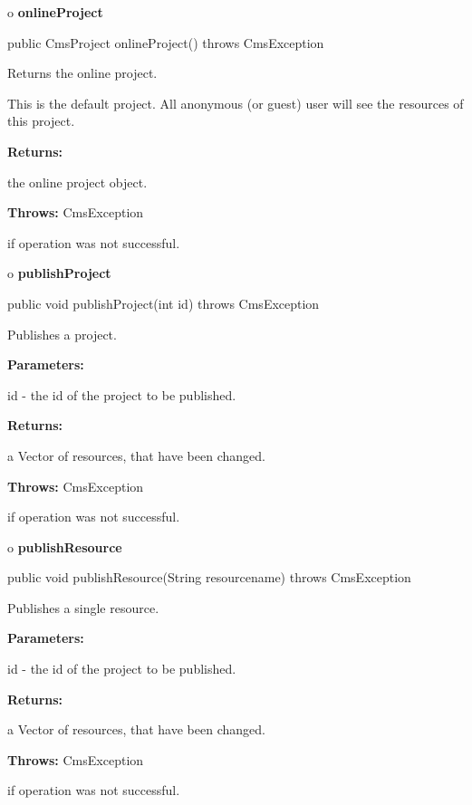 o {\bf onlineProject} 

\begin{PRE}
 public CmsProject onlineProject() throws CmsException
\end{PRE}

\begin{description}
\htmlDD Returns the online project. 

This is the default project. All anonymous (or guest) user will see the
resources of this project. 

\begin{description}
\item {\bf Returns:}  

the online project object.  
\item {\bf Throws:} CmsException  

if operation was not successful.  
\end{description}

\end{description}

o {\bf publishProject} 

\begin{PRE}
 public void publishProject(int id) throws CmsException
\end{PRE}

\begin{description}
\htmlDD Publishes a project. 

\begin{description}
\item {\bf Parameters:}  

id - the id of the project to be published.  
\item {\bf Returns:}  

a Vector of resources, that have been changed.  
\item {\bf Throws:} CmsException  

if operation was not successful.  
\end{description}

\end{description}

o {\bf publishResource} 

\begin{PRE}
 public void publishResource(String resourcename) throws CmsException
\end{PRE}

\begin{description}
\htmlDD Publishes a single resource. 

\begin{description}
\item {\bf Parameters:}  

id - the id of the project to be published.  
\item {\bf Returns:}  

a Vector of resources, that have been changed.  
\item {\bf Throws:} CmsException  

if operation was not successful.  
\end{description}

\end{description}

